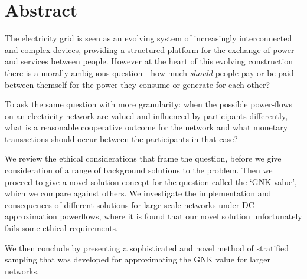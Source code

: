 \chapter*{Abstract}
\vspace{-1em}
The electricity grid is seen as an evolving system of increasingly interconnected and complex devices, providing a structured platform for the exchange of power and services between people.
However at the heart of this evolving construction there is a morally ambiguous question - how much \textit{should} people pay or be-paid between themself for the power they consume or generate for each other?

To ask the same question with more granularity: when the possible power-flows on an electricity network are valued and influenced by participants differently, what is a reasonable cooperative outcome for the network and what monetary transactions should occur between the participants in that case?

We review the ethical considerations that frame the question, before we give consideration of a range of background solutions to the problem.
Then we proceed to give a novel solution concept for the question called the `GNK value', which we compare against others.
We investigate the implementation and consequences of different solutions for large scale networks under DC-approximation powerflows, where it is found that our novel solution unfortunately fails some ethical requirements.

We then conclude by presenting a sophisticated and novel method of stratified sampling that was developed for approximating the GNK value for larger networks.

